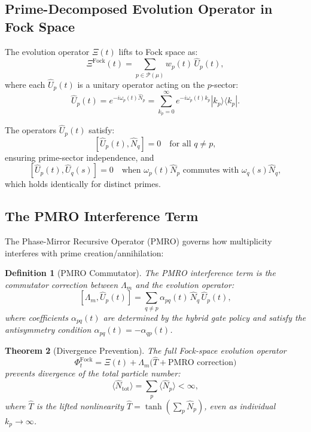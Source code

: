 \documentclass[12pt]{amsart}
\theoremstyle{plain}
\newtheorem{theorem}{Theorem}[section]
\newtheorem{definition}[theorem]{Definition}
\begin{document}
\subsection{Prime-Decomposed Evolution Operator in Fock Space}

The evolution operator \(\Xi(t)\) lifts to Fock space as:
\[
\Xi^{\text{Fock}}(t) = \sum_{p \in \mathcal{P}(\mu)} w_p(t) \, \hat{U}_p(t),
\]
where each \(\hat{U}_p(t)\) is a unitary operator acting on the \(p\)-sector:
\[
\hat{U}_p(t) = e^{-i \omega_p(t) \hat{N}_p} = \sum_{k_p=0}^\infty e^{-i \omega_p(t) k_p} |k_p\rangle\langle k_p|.
\]

\begin{proposition}\label{prop:spectral}
The operators \(\hat{U}_p(t)\) satisfy:
\[
[\hat{U}_p(t), \hat{N}_q] = 0 \quad \text{for all } q \neq p,
\]
ensuring prime-sector independence, and
\[
[\hat{U}_p(t), \hat{U}_q(s)] = 0 \quad \text{when } \omega_p(t) \hat{N}_p \text{ commutes with } \omega_q(s) \hat{N}_q,
\]
which holds identically for distinct primes.
\end{proposition}

\subsection{The PMRO Interference Term}

The Phase-Mirror Recursive Operator (PMRO) governs how multiplicity interferes with prime creation/annihilation:

\begin{definition}[PMRO Commutator]
The PMRO interference term is the commutator correction between \(\Lambda_m\) and the evolution operator:
\[
[\Lambda_m, \hat{U}_p(t)] = \sum_{q \neq p} \alpha_{pq}(t) \, \hat{N}_q \, \hat{U}_p(t),
\]
where coefficients \(\alpha_{pq}(t)\) are determined by the hybrid gate policy and satisfy the antisymmetry condition \(\alpha_{pq}(t) = -\alpha_{qp}(t)\).
\end{definition}

\begin{theorem}[Divergence Prevention]\label{thm:divergence}
The full Fock-space evolution operator
\[
\Phi_t^{\text{Fock}} = \Xi(t) + \Lambda_m \bigl( \hat{T} + \text{PMRO correction} \bigr)
\]
prevents divergence of the total particle number:
\[
\langle \hat{N}_{\text{tot}} \rangle = \sum_p \langle \hat{N}_p \rangle < \infty,
\]
where \(\hat{T}\) is the lifted nonlinearity \(\hat{T} = \tanh(\sum_p \hat{N}_p)\), even as individual \(k_p \to \infty\).
\end{theorem}
\end{document}
